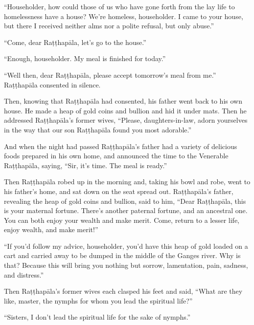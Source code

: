 \documentclass[12pt,openany]{book}%
\begin{document}
“Householder, how could those of us who have gone forth from the lay life to homelessness have a house? We’re homeless, householder. I came to your house, but there I received neither alms nor a polite refusal, but only abuse.” 

“Come, dear \textsanskrit{Raṭṭhapāla}, let’s go to the house.” 

“Enough, householder. My meal is finished for today.” 

“Well then, dear \textsanskrit{Raṭṭhapāla}, please accept tomorrow’s meal from me.” \textsanskrit{Raṭṭhapāla} consented in silence. 

Then, knowing that \textsanskrit{Raṭṭhapāla} had consented, his father went back to his own house. He made a heap of gold coins and bullion and hid it under mats. Then he addressed \textsanskrit{Raṭṭhapāla}’s former wives, “Please, daughters-in-law, adorn yourselves in the way that our son \textsanskrit{Raṭṭhapāla} found you most adorable.” 

And when the night had passed \textsanskrit{Raṭṭhapāla}’s father had a variety of delicious foods prepared in his own home, and announced the time to the Venerable \textsanskrit{Raṭṭhapāla}, saying, “Sir, it’s time. The meal is ready.” 

Then \textsanskrit{Raṭṭhapāla} robed up in the morning and, taking his bowl and robe, went to his father’s home, and sat down on the seat spread out. \textsanskrit{Raṭṭhapāla}’s father, revealing the heap of gold coins and bullion, said to him, “Dear \textsanskrit{Raṭṭhapāla}, this is your maternal fortune. There’s another paternal fortune, and an ancestral one. You can both enjoy your wealth and make merit. Come, return to a lesser life, enjoy wealth, and make merit!” 

“If you’d follow my advice, householder, you’d have this heap of gold loaded on a cart and carried away to be dumped in the middle of the Ganges river. Why is that? Because this will bring you nothing but sorrow, lamentation, pain, sadness, and distress.” 

Then \textsanskrit{Raṭṭhapāla}’s former wives each clasped his feet and said, “What are they like, master, the nymphs for whom you lead the spiritual life?” 

“Sisters, I don’t lead the spiritual life for the sake of nymphs.” 
\end{document}
